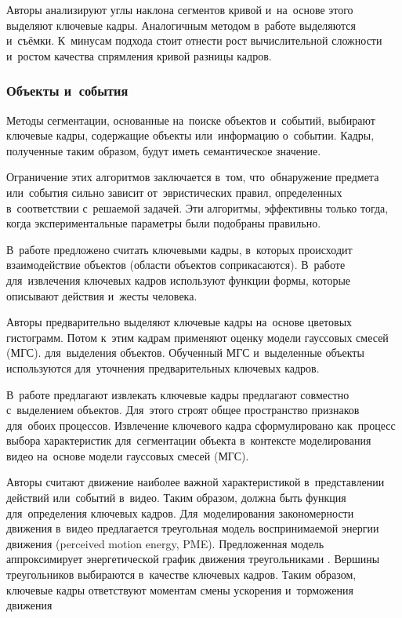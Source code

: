 Авторы анализируют углы наклона сегментов кривой
и~на~основе этого выделяют ключевые кадры.
Аналогичным методом в~работе выделяются и~съёмки.
К~минусам подхода стоит отнести рост вычислительной сложности
и~ростом качества спрямления кривой разницы кадров.

\subsubsection{Объекты и~события}

Методы сегментации, основанные на~поиске объектов и~событий, выбирают
ключевые кадры, содержащие объекты или~информацию о~событии.
Кадры, полученные таким образом, будут иметь семантическое значение.

Ограничение этих алгоритмов заключается в~том,
что~обнаружение предмета или~события сильно зависит
от~эвристических правил, определенных в~соответствии с~решаемой задачей.
Эти алгоритмы, эффективны только тогда,
когда экспериментальные параметры были подобраны правильно.

В~работе \cite{Calic:2004} предложено считать ключевыми кадры,
в~которых происходит взаимодействие объектов (области объектов соприкасаются).
В~работе \cite{Kim:2001} для~извлечения ключевых кадров
используют функции формы, которые описывают действия и~жесты человека.

Авторы \cite{Liu:2005} предварительно выделяют ключевые кадры
на~основе цветовых гистограмм. Потом к~этим кадрам применяют
оценку модели гауссовых смесей
(МГС).
для~выделения объектов. Обученный МГС и~выделенные объекты
используются для~уточнения предварительных ключевых кадров.

В~работе \cite{Song:2006} предлагают извлекать ключевые кадры предлагают
совместно с~выделением объектов.
Для~этого строят общее пространство признаков для~обоих процессов.
Извлечение ключевого кадра сформулировано как~процесс выбора характеристик
для~сегментации объекта в~контексте моделирования видео на~основе
модели гауссовых смесей (МГС).

Авторы \cite{Liu:2003} считают движение наиболее важной характеристикой
в~представлении действий или~событий в~видео.
Таким образом, должна быть функция для~определения ключевых кадров.
Для~моделирования закономерности движения в~видео
предлагается {треугольная модель}
воспринимаемой энергии движения
(perceived motion energy, PME).
Предложенная модель аппроксимирует энергетической
график движения треугольниками \cite{zhang:2008}.
Вершины треугольников выбираются в~качестве ключевых кадров.
Таким образом, ключевые кадры ответствуют моментам смены
ускорения и~торможения движения

